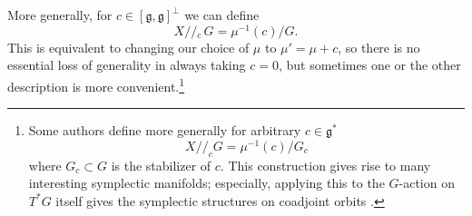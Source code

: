 \documentclass[12pt,letterpaper,reqno]{article}
\numberwithin{equation}{section}
\newcommand{\fg}{{\mathfrak g}}
\newcommand{\kq}{/\!\!/}
\newcommand{\kql}[1]{/\!\!/\!\!_#1\,}
\begin{document}
More generally, for $c \in [\fg,\fg]^\perp$ we can define
\begin{equation}
  X \kql{c} G = \mu^{-1}(c) / G.
\end{equation}
This is equivalent to changing our choice of $\mu$ to $\mu' = \mu+c$,
so there is no essential loss of generality in always taking $c = 0$,
but sometimes one or the other description is more convenient.\footnote{Some authors define more generally for arbitrary 
$c \in \fg^*$
\begin{equation}
  X \kq_c G = \mu^{-1}(c) / G_c
\end{equation}
where $G_c \subset G$ is the stabilizer of $c$. This construction
gives rise to many interesting symplectic manifolds; especially,
applying this to the $G$-action on $T^* G$ itself gives the
symplectic structures on coadjoint orbits \cite{MR0402819}.}
\end{document}
